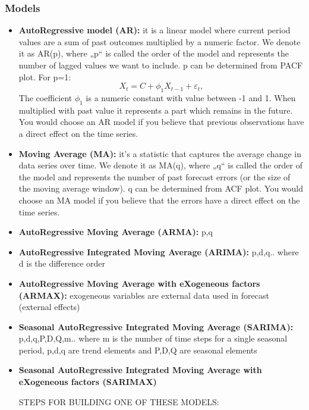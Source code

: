 \documentclass[
  letterpaper,
  DIV=11,
  numbers=noendperiod]{scrreprt}
\begin{document}
\hypertarget{models}{%
\subsubsection{Models}\label{models}}

\begin{itemize}
\item
  \textbf{AutoRegressive model (AR):} it is a linear model where current
  period values are a sum of past outcomes multiplied by a numeric
  factor. We denote it as AR(p), where „p`` is called the order of the
  model and represents the number of lagged values we want to include. p
  can be determined from PACF plot. For p=1:
  \[ X_{t} = C + \phi_{1}X_{t-1} + \varepsilon_{t}, \] The coefficient
  \(\phi_{1}\) is a numeric constant with value between -1 and 1. When
  multiplied with past value it represents a part which remains in the
  future. You would choose an AR model if you believe that previous
  observations have a direct effect on the time series.
\item
  \textbf{Moving Average (MA):} it's a statistic that captures the
  average change in data series over time. We denote it as MA(q), where
  „q`` is called the order of the model and represents the number of
  past forecast errors (or the size of the moving average window). q can
  be determined from ACF plot. You would choose an MA model if you
  believe that the errors have a direct effect on the time series.
\item
  \textbf{AutoRegressive Moving Average (ARMA):} p,q
\item
  \textbf{AutoRegressive Integrated Moving Average (ARIMA):} p,d,q..
  where d is the difference order
\item
  \textbf{AutoRegressive Moving Average with eXogeneous factors
  (ARMAX):} exogeneous variables are external data used in forecast
  (external effects)
\item
  \textbf{Seasonal AutoRegressive Integrated Moving Average (SARIMA):}
  p,d,q,P,D,Q,m.. where m is the number of time steps for a single
  seasonal period, p,d,q are trend elements and P,D,Q are seasonal
  elements
\item
  \textbf{Seasonal AutoRegressive Integrated Moving Average with
  eXogeneous factors (SARIMAX)}

  STEPS FOR BUILDING ONE OF THESE MODELS:


\end{itemize}
\end{document}
